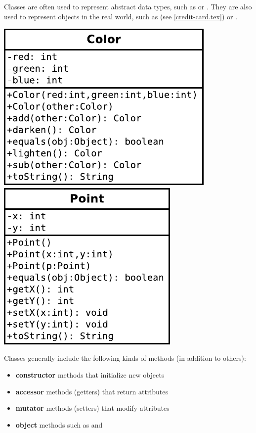 
Classes are often used to represent abstract data types, such as  or .
They are also used to represent objects in the real world, such as  (see \ref{credit-card.tex}) or .

\begin{center}
\includegraphics{Color.pdf}  %
~~~~~
\includegraphics{Point.pdf}  %
\end{center}

Classes generally include the following kinds of methods (in addition to others):
\begin{itemize}[itemsep=0pt]
\item \textbf{constructor} methods that initialize new objects
\item \textbf{accessor} methods (getters) that return attributes
\item \textbf{mutator} methods (setters) that modify attributes
\item \textbf{object} methods such as  and 
\end{itemize}


